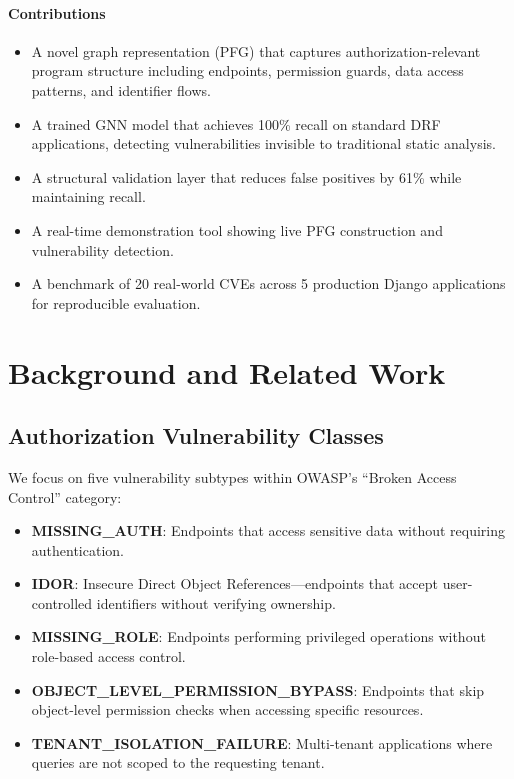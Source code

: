 \documentclass[conference]{IEEEtran}
\begin{document}
\paragraph{Contributions}
\begin{itemize}
    \item A novel graph representation (PFG) that captures authorization-relevant program structure including endpoints, permission guards, data access patterns, and identifier flows.
    \item A trained GNN model that achieves 100\% recall on standard DRF applications, detecting vulnerabilities invisible to traditional static analysis.
    \item A structural validation layer that reduces false positives by 61\% while maintaining recall.
    \item A real-time demonstration tool showing live PFG construction and vulnerability detection.
    \item A benchmark of 20 real-world CVEs across 5 production Django applications for reproducible evaluation.
\end{itemize}

\section{Background and Related Work}

\subsection{Authorization Vulnerability Classes}

We focus on five vulnerability subtypes within OWASP's ``Broken Access Control'' category:

\begin{itemize}
    \item \textbf{MISSING\_AUTH}: Endpoints that access sensitive data without requiring authentication.
    \item \textbf{IDOR}: Insecure Direct Object References—endpoints that accept user-controlled identifiers without verifying ownership.
    \item \textbf{MISSING\_ROLE}: Endpoints performing privileged operations without role-based access control.
    \item \textbf{OBJECT\_LEVEL\_PERMISSION\_BYPASS}: Endpoints that skip object-level permission checks when accessing specific resources.
    \item \textbf{TENANT\_ISOLATION\_FAILURE}: Multi-tenant applications where queries are not scoped to the requesting tenant.
\end{itemize}
\end{document}
